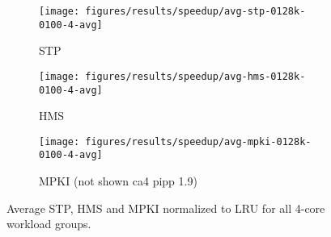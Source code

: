 \begin{figure}[th]
    \centering
    \begin{subfigure}[b]{0.5\textwidth}
        \texttt{[image: figures/results/speedup/avg-stp-0128k-0100-4-avg]}
        \caption{STP}
        \label{fig:results:base:4-avg:stp}
    \end{subfigure}%
    \begin{subfigure}[b]{0.5\textwidth}
        \texttt{[image: figures/results/speedup/avg-hms-0128k-0100-4-avg]}
        \caption{HMS}
        \label{fig:results:base:4-avg:hms}
    \end{subfigure}
    \begin{subfigure}[b]{0.5\textwidth}
        \texttt{[image: figures/results/speedup/avg-mpki-0128k-0100-4-avg]}
        \caption{MPKI (not shown ca4 pipp 1.9)}
        \label{fig:results:base:4-avg:mpki}
    \end{subfigure}
    \caption[Average result for 4-core workloads]{Average STP, HMS and MPKI normalized to LRU for all 4-core workload groups.}
    \label{fig:results:base:4-avg} 
\end{figure}


